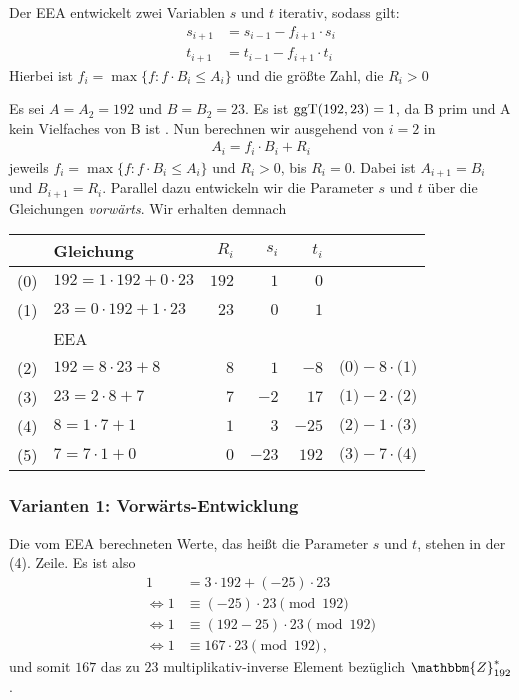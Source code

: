 Der EEA entwickelt zwei Variablen $s$ und $t$ iterativ, sodass gilt: 
    \begin{align*}
      s_{i+1} &= s_{i-1} - f_{i+1} \cdot s_{i}\\
      t_{i+1} &= t_{i-1} - f_{i+1} \cdot t_{i}
    \end{align*}
Hierbei ist $f_i = \max \{f : f \cdot B_i \leq A_i\}$ und die größte
Zahl, die  $R_i > 0$
  \begin{beispiel}[EEA]
    Es sei $A = A_2 = 192 $ und $B = B_2 = 23$. Es ist $\operatorname{ggT}(192, 23) =
    1$, da B prim und A kein Vielfaches von B ist . Nun berechnen wir
    ausgehend von $i = 2$ in 
    \begin{align*}
      A_i = f_i \cdot B_i + R_i
    \end{align*}
    jeweils $f_i = \max \{f : f \cdot B_i \leq A_i\}$ und $R_i > 0$, bis
    $R_i = 0$. Dabei ist $A_{i+1} = B_i$ und $B_{i+1} = R_i$. Parallel
    dazu entwickeln wir die Parameter $s$ und $t$ über die Gleichungen 
    \emph{vorwärts}. Wir erhalten demnach
    \begin{table}[h]
      \centering
      \large
      \begin{tabular}[c]{|c|l|rrr|l|}
        \hline
        & Gleichung & $R_i$ & $s_i$ & $t_i$ &\\
        \hline
        \hline
        (0) & $192 = 1 \cdot 192 + 0 \cdot 23$ & $192$ & $1$ & $0$ &\\
        (1) & $23 = 0 \cdot 192 + 1 \cdot 23$ & $23$ & $0$ & $1$ &\\
        \hline 
        & EEA & & & &\\
        \hline
        (2) & $192 = 8 \cdot 23 + 8$ & $8$ & $1$ & $-8$ & $\text{(0)} - 8 \cdot \text{(1)}$\\
        (3) & $23 =  2 \cdot 8 + 7$ & $7$ & $-2$ & $17$ & $\text{(1)} - 2 \cdot \text{(2)}$\\
        (4) & $8 = 1 \cdot 7 + 1$ & $1$ & $3$ & $-25$ & $\text{(2)} - 1 \cdot \text{(3)}$\\ 
        (5) & $7 = 7 \cdot 1 + 0$ & $0$ & $-23$ & $192$ & $\text{(3)} - 7 \cdot \text{(4)}$\\
        \hline
      \end{tabular}
    \end{table}
    \subsubsection*{Varianten 1: Vorwärts-Entwicklung}
    Die vom EEA berechneten Werte, das heißt die Parameter $s$ und $t$, stehen in der (4). Zeile. Es ist also 
    \begin{align*}
      1 &= 3 \cdot 192 + (-25) \cdot 23\\
      \Leftrightarrow 1 &\equiv (-25) \cdot 23 \pmod{192}\\
      \Leftrightarrow 1 &\equiv (192 - 25) \cdot 23 \pmod{192}\\ 
      \Leftrightarrow 1 &\equiv 167 \cdot 23 \pmod{192}\, \text{,}
    \end{align*}
    und somit $167$ das zu $23$ multiplikativ-inverse Element bezüglich
    $\mathbbm{Z}^{\ast}_{192}$.

\end{beispiel}
